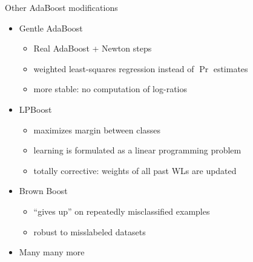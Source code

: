 \documentclass[handout]{beamer}
\begin{document}
\begin{frame}{Other AdaBoost modifications}
\begin{itemize}[<+>]
	\item Gentle AdaBoost \cite{FriedmanEtAl2000}
	\begin{itemize}[<.->]
		\item Real AdaBoost + Newton steps
		\item weighted least-squares regression instead of $ \Pr $ estimates
		\item more stable: no computation of log-ratios
	\end{itemize}

	\item LPBoost \cite{DemirizEtAl2002}
	\begin{itemize}[<.->]
		\item maximizes margin between classes
		\item learning is formulated as a linear programming problem
		\item totally corrective: weights of all past WLs are updated
	\end{itemize}

	\item Brown Boost \cite{Freund2001}
	\begin{itemize}[<.->]
		\item ``gives up'' on repeatedly misclassified examples
		\item robust to misslabeled datasets
	\end{itemize}

	\item Many many more \cite{FerrFigu2012}
\end{itemize}
\end{frame}
\end{document}
